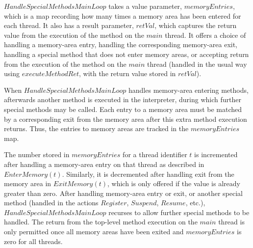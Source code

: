 $HandleSpecialMethodsMainLoop$ takes a value parameter,
$memoryEntries$, which is a map recording how many times a memory area
has been entered for each thread.
It also has a result parameter, $retVal$, which captures the return
value from the execution of the method on the $main$ thread.
It offers a choice of handling a memory-area entry, handling the
corresponding memory-area exit, handling a special method that does
not enter memory areas, or accepting return from the execution of the
method on the $main$ thread (handled in the usual way using
$executeMethodRet$, with the return value stored in $retVal$).

When $HandleSpecialMethodsMainLoop$ handles memory-area entering
methods, afterwards another method is executed in the interpreter,
during which further special methods may be called.
Each entry to a memory area must be matched by a corresponding exit
from the memory area after this extra method execution returns.
Thus, the entries to memory areas are tracked in the $memoryEntries$
map.

The number stored in $memoryEntries$ for a thread identifier $t$ is
incremented after handling a memory-area entry on that thread as
described in $EnterMemory(t)$.
Similarly, it is decremented after handling exit from the memory area
in $ExitMemory(t)$, which is only offered if the value is already
greater than zero.
After handling memory-area entry or exit, or another special method
(handled in the actions $Register$, $Suspend$, $Resume$, etc.),
$HandleSpecialMethodsMainLoop$ recurses to allow further special
methods to be handled.
The return from the top-level method execution on the $main$ thread is
only permitted once all memory areas have been exited and
$memoryEntries$ is zero for all threads.

